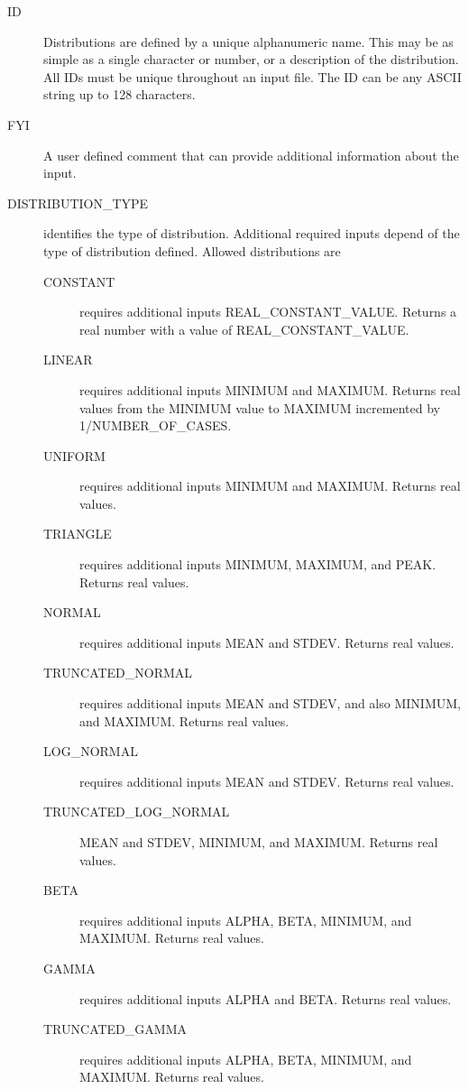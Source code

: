 \documentclass[12pt,twoside]{book}
\begin{document}
\begin{description}
  \item[ID] Distributions are defined by a unique alphanumeric name. This may be as simple as a single character or number, or a description of the distribution. All IDs must be unique throughout an input file. The { \ct ID} can be any ASCII string up to 128 characters.
  \item[FYI] A user defined comment that can provide additional information about the input.
  \item[DISTRIBUTION\_TYPE] identifies the type of distribution. Additional required inputs depend of the type of distribution defined. Allowed distributions are
      \begin{description}
        \item[CONSTANT] requires additional inputs {\ct REAL\_CONSTANT\_VALUE}. Returns a real number with a value of {\ct REAL\_CONSTANT\_VALUE}.
        \item[LINEAR] requires additional inputs {\ct MINIMUM} and {\ct MAXIMUM}. Returns real values from the {\ct MINIMUM} value to {\ct MAXIMUM} incremented by 1/{\ct NUMBER\_OF\_CASES}.
        \item[UNIFORM] requires additional inputs {\ct MINIMUM} and {\ct MAXIMUM}. Returns real values.
        \item[TRIANGLE] requires additional inputs {\ct MINIMUM}, {\ct MAXIMUM}, and {\ct PEAK}. Returns real values.
        \item[NORMAL] requires additional inputs {\ct MEAN} and {\ct STDEV}. Returns real values.
        \item[TRUNCATED\_NORMAL] requires additional inputs {\ct MEAN} and {\ct STDEV}, and also {\ct MINIMUM}, and {\ct MAXIMUM}. Returns real values.
        \item[LOG\_NORMAL] requires additional inputs {\ct MEAN} and {\ct STDEV}. Returns real values.
        \item[TRUNCATED\_LOG\_NORMAL] {\ct MEAN} and {\ct STDEV}, {\ct MINIMUM}, and {\ct MAXIMUM}. Returns real values.
        \item[BETA] requires additional inputs {\ct ALPHA}, {\ct BETA}, {\ct MINIMUM}, and {\ct MAXIMUM}. Returns real values.
        \item[GAMMA] requires additional inputs {\ct ALPHA} and {\ct BETA}. Returns real values.
        \item[TRUNCATED\_GAMMA] requires additional inputs {\ct ALPHA}, {\ct BETA}, {\ct MINIMUM}, and {\ct MAXIMUM}. Returns real values.

\end{description}
\end{description}
\end{document}
